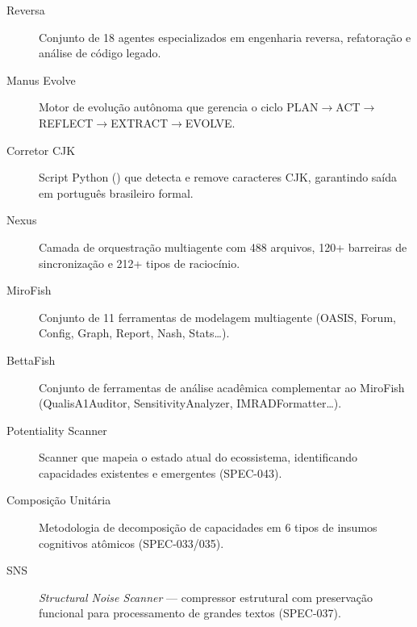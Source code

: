 \begin{description}
\item[Reversa] Conjunto de 18 agentes especializados em engenharia reversa,
refatoração e análise de código legado.

\item[Manus Evolve] Motor de evolução autônoma que gerencia o ciclo
PLAN$\to$ACT$\to$REFLECT$\to$EXTRACT$\to$EVOLVE.

\item[Corretor CJK] Script Python () que detecta
e remove caracteres CJK, garantindo saída em português brasileiro formal.

\item[Nexus] Camada de orquestração multiagente com 488 arquivos, 120+
barreiras de sincronização e 212+ tipos de raciocínio.

\item[MiroFish] Conjunto de 11 ferramentas de modelagem multiagente
(OASIS, Forum, Config, Graph, Report, Nash, Stats\dots).

\item[BettaFish] Conjunto de ferramentas de análise acadêmica complementar
ao MiroFish (QualisA1Auditor, SensitivityAnalyzer, IMRADFormatter\dots).

\item[Potentiality Scanner] Scanner que mapeia o estado atual do
ecossistema, identificando capacidades existentes e emergentes (SPEC-043).

\item[Composição Unitária] Metodologia de decomposição de capacidades em
6 tipos de insumos cognitivos atômicos (SPEC-033/035).

\item[SNS] \emph{Structural Noise Scanner} --- compressor estrutural com
preservação funcional para processamento de grandes textos (SPEC-037).

\end{description}
